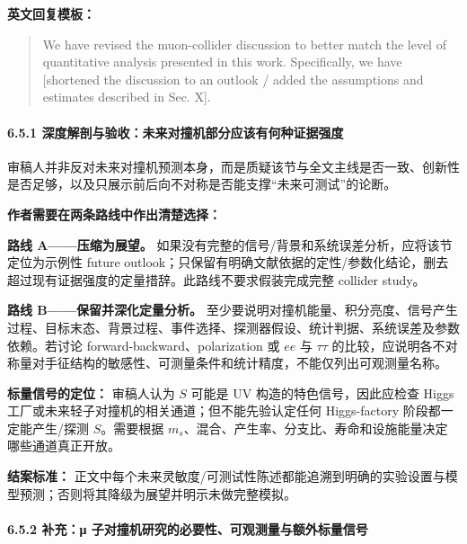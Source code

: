\documentclass[
]{article}
\begin{document}
\textbf{英文回复模板：}

\begin{quote}
We have revised the muon-collider discussion to better match the level
of quantitative analysis presented in this work. Specifically, we have
{[}shortened the discussion to an outlook / added the assumptions and
estimates described in Sec. X{]}.
\end{quote}

\paragraph{6.5.1
深度解剖与验收：未来对撞机部分应该有何种证据强度}\label{ux6df1ux5ea6ux89e3ux5256ux4e0eux9a8cux6536ux672aux6765ux5bf9ux649eux673aux90e8ux5206ux5e94ux8be5ux6709ux4f55ux79cdux8bc1ux636eux5f3aux5ea6}

审稿人并非反对未来对撞机预测本身，而是质疑该节与全文主线是否一致、创新性是否足够，以及只展示前后向不对称是否能支撑``未来可测试''的论断。

\textbf{作者需要在两条路线中作出清楚选择：}

\textbf{路线 A------压缩为展望。}
如果没有完整的信号/背景和系统误差分析，应将该节定位为示例性 future
outlook；只保留有明确文献依据的定性/参数化结论，删去超过现有证据强度的定量措辞。此路线不要求假装完成完整
collider study。

\textbf{路线 B------保留并深化定量分析。}
至少要说明对撞机能量、积分亮度、信号产生过程、目标末态、背景过程、事件选择、探测器假设、统计判据、系统误差及参数依赖。若讨论
forward-backward、polarization 或 \(ee\) 与 \(\tau\tau\)
的比较，应说明各不对称量对手征结构的敏感性、可测量条件和统计精度，不能仅列出可观测量名称。

\textbf{标量信号的定位：} 审稿人认为 \(S\) 可能是 UV
构造的特色信号，因此应检查 Higgs
工厂或未来轻子对撞机的相关通道；但不能先验认定任何 Higgs-factory
阶段都一定能产生/探测 \(S\)。需要根据
\(m_s\)、混合、产生率、分支比、寿命和设施能量决定哪些通道真正开放。

\textbf{结案标准：}
正文中每个未来灵敏度/可测试性陈述都能追溯到明确的实验设置与模型预测；否则将其降级为展望并明示未做完整模拟。

\paragraph{6.5.2 补充：μ
子对撞机研究的必要性、可观测量与额外标量信号}\label{ux8865ux5145ux3bc-ux5b50ux5bf9ux649eux673aux7814ux7a76ux7684ux5fc5ux8981ux6027ux53efux89c2ux6d4bux91cfux4e0eux989dux5916ux6807ux91cfux4fe1ux53f7}
\end{document}
